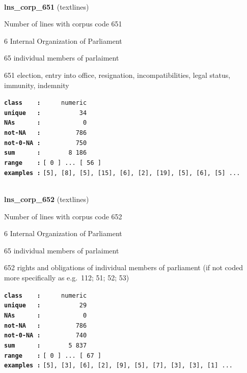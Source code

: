 \documentclass[]{article}
\begin{document}
~

\textbf{lns\_corp\_651} (textlines)

Number of lines with corpus code 651

6 Internal Organization of Parliament

65 individual members of parlaiment

651 election, entry into office, resignation, incompatibilities, legal
status, immunity, indemnity

\textbf{\texttt{class\ \ \ \ :}} \texttt{~~~~~numeric}\\
\textbf{\texttt{unique\ \ \ :}} \texttt{~~~~~~~~~~34}\\
\textbf{\texttt{NAs\ \ \ \ \ \ :}} \texttt{~~~~~~~~~~~0}\\
\textbf{\texttt{not-NA\ \ \ :}} \texttt{~~~~~~~~~786}\\
\textbf{\texttt{not-0-NA\ :}} \texttt{~~~~~~~~~750}\\
\textbf{\texttt{sum\ \ \ \ \ \ :}} \texttt{~~~~~~~8~186}\\
\textbf{\texttt{range\ \ \ \ :}}
\texttt{{[}\ 0\ {]}\ ...\ {[}\ 56\ {]}}\\
\textbf{\texttt{examples\ :}}
\texttt{{[}5{]},\ {[}8{]},\ {[}5{]},\ {[}15{]},\ {[}6{]},\ {[}2{]},\ {[}19{]},\ {[}5{]},\ {[}6{]},\ {[}5{]}\ ...}\\

~

\textbf{lns\_corp\_652} (textlines)

Number of lines with corpus code 652

6 Internal Organization of Parliament

65 individual members of parlaiment

652 rights and obligations of individual members of parliament (if not
coded more specifically as e.g.~112; 51; 52; 53)

\textbf{\texttt{class\ \ \ \ :}} \texttt{~~~~~numeric}\\
\textbf{\texttt{unique\ \ \ :}} \texttt{~~~~~~~~~~29}\\
\textbf{\texttt{NAs\ \ \ \ \ \ :}} \texttt{~~~~~~~~~~~0}\\
\textbf{\texttt{not-NA\ \ \ :}} \texttt{~~~~~~~~~786}\\
\textbf{\texttt{not-0-NA\ :}} \texttt{~~~~~~~~~740}\\
\textbf{\texttt{sum\ \ \ \ \ \ :}} \texttt{~~~~~~~5~837}\\
\textbf{\texttt{range\ \ \ \ :}}
\texttt{{[}\ 0\ {]}\ ...\ {[}\ 67\ {]}}\\
\textbf{\texttt{examples\ :}}
\texttt{{[}5{]},\ {[}3{]},\ {[}6{]},\ {[}2{]},\ {[}9{]},\ {[}5{]},\ {[}7{]},\ {[}3{]},\ {[}3{]},\ {[}1{]}\ ...}\\
\end{document}
